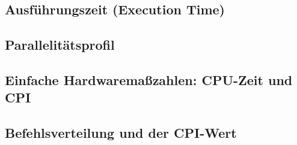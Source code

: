 \subsection{Ausführungszeit (Execution Time)}

\subsection{Parallelitätsprofil}

\subsection{Einfache Hardwaremaßzahlen:  CPU-Zeit und CPI}

\subsection{Befehlsverteilung und der CPI-Wert}













